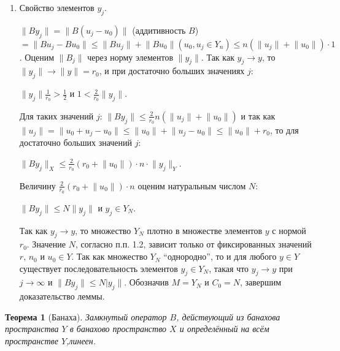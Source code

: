 \documentclass[12pt,a4paper,titlepage]{book}
\theoremstyle{definition}
\theoremstyle{plain}
\newtheorem*{theorem}{Теорема}
\theoremstyle{remark}
\theoremstyle{remark}
\theoremstyle{remark}
\theoremstyle{plain}
\begin{document}
\begin{enumerate}
\item Свойство элементов $y_j$.

$\lVert By_j\rVert = \lVert B(u_j - u_0)\rVert$ (аддитивность $B$) $ = \lVert Bu_j - Bu_0\rVert \le \lVert Bu_j\rVert + \lVert Bu_0\rVert(u_0, u_j \in Y_n) \le n(\lVert u_j\rVert + \lVert u_0\rVert)\cdot 1$.
Оценим $\lVert B_j\rVert$ через норму элементов $\lVert y_j\rVert$. Так как $y_j \to y$, то $\lVert y_j\rVert \to \lVert y\rVert=r_0$, и при достаточно больших значениях $j$:

\begin{center}
$\lVert y_j\rVert\frac{1}{r_0}>\frac12$ и $1<\frac{2}{r_0}\lVert y_j\rVert$.
\end{center}

Для таких значений $j$: $\lVert By_j\rVert\le\frac{2}{r_0}n(\lVert u_j\rVert + \lVert u_0\rVert)$ и так как $\lVert u_j\rVert = \lVert u_0 + u_j - u_0\rVert \le \lVert u_0\rVert + \lVert u_j - u_0\rVert \le \lVert u_0\rVert + r_0$, то для достаточно больших значений $j$:

\begin{center}
$\lVert By_j\rVert_X \le \frac{2}{r_0}(r_0 + \lVert u_0\rVert)\cdot n\cdot \lVert y_j\rVert_Y$.
\end{center}

Величину $\frac{2}{r_0}(r_0 + \lVert u_0\rVert)\cdot n$ оценим натуральным числом $N$:

\begin{center}
$\lVert By_j\rVert \le N\lVert y_j\rVert$ и $y_j \in Y_N$.
\end{center}

Так как $y_j \to y$, то множество $Y_N$ плотно в множестве элементов $y$ с нормой $r_0$. Значение $N$, согласно п.п. 1.2, зависит только от фиксированных значений $r$, $n_0$ и $u_0 \in Y$. Так как множество $Y_N$ ``однородно'', то и для любого $y \in Y$ существует последовательность элементов $y_j \in Y_N$, такая что $y_j \to y$ при $j \to \infty$ и $\lVert By_j\rVert \le N\lvert y_j\rVert$. Обозначив $M = Y_N$ и $C_0 = N$, завершим доказательство леммы.

\end{enumerate}


\begin{theorem}[Банаха]
Замкнутый оператор $B$, действующий из банахова пространства $Y$ в банахово пространство $X$ и определённый на всём пространстве $Y$,линеен.
\end{theorem}
\end{document}
